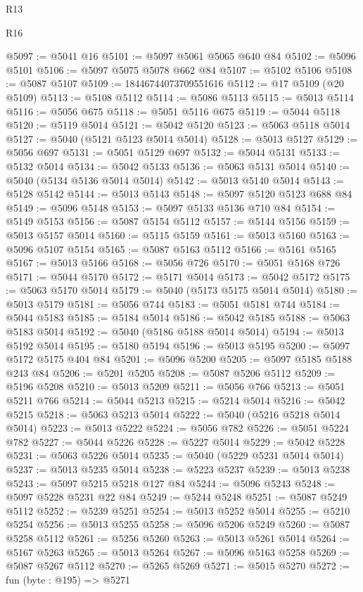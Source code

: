\begin{lexlean}{R13}
\begin{lexlean}{R16}
\begin{coremodule}
{{{{{{{{{{{{{{{{{{{{{{{{{{{{{{{{{{{{{{{{{{{{{{{{{{{{{{{{{{{{{{{{{{{{{{{{{{{{{{{{{{{{{{{{{{{{{{{{{{{{{{{{{{{{{{{{{@5097 := @5041 @16
@5101 := @5097 @5061 @5065 @640 @84
@5102 := @5096 @5101
@5106 := @5097 @5075 @5078 @662 @84
@5107 := @5102 @5106
@5108 := @5087 @5107
@5109 := 18446744073709551616
@5112 := @17 @5109 (@20 @5109)
@5113 := @5108 @5112
@5114 := @5086 @5113
@5115 := @5013 @5114
@5116 := @5056 @675
@5118 := @5051 @5116 @675
@5119 := @5044 @5118
@5120 := @5119 @5014
@5121 := @5042 @5120
@5123 := @5063 @5118 @5014
@5127 := @5040 (@5121 @5123 @5014 @5014)
@5128 := @5013 @5127
@5129 := @5056 @697
@5131 := @5051 @5129 @697
@5132 := @5044 @5131
@5133 := @5132 @5014
@5134 := @5042 @5133
@5136 := @5063 @5131 @5014
@5140 := @5040 (@5134 @5136 @5014 @5014)
@5142 := @5013 @5140 @5014
@5143 := @5128 @5142
@5144 := @5013 @5143
@5148 := @5097 @5120 @5123 @688 @84
@5149 := @5096 @5148
@5153 := @5097 @5133 @5136 @710 @84
@5154 := @5149 @5153
@5156 := @5087 @5154 @5112
@5157 := @5144 @5156
@5159 := @5013 @5157 @5014
@5160 := @5115 @5159
@5161 := @5013 @5160
@5163 := @5096 @5107 @5154
@5165 := @5087 @5163 @5112
@5166 := @5161 @5165
@5167 := @5013 @5166
@5168 := @5056 @726
@5170 := @5051 @5168 @726
@5171 := @5044 @5170
@5172 := @5171 @5014
@5173 := @5042 @5172
@5175 := @5063 @5170 @5014
@5179 := @5040 (@5173 @5175 @5014 @5014)
@5180 := @5013 @5179
@5181 := @5056 @744
@5183 := @5051 @5181 @744
@5184 := @5044 @5183
@5185 := @5184 @5014
@5186 := @5042 @5185
@5188 := @5063 @5183 @5014
@5192 := @5040 (@5186 @5188 @5014 @5014)
@5194 := @5013 @5192 @5014
@5195 := @5180 @5194
@5196 := @5013 @5195
@5200 := @5097 @5172 @5175 @404 @84
@5201 := @5096 @5200
@5205 := @5097 @5185 @5188 @243 @84
@5206 := @5201 @5205
@5208 := @5087 @5206 @5112
@5209 := @5196 @5208
@5210 := @5013 @5209
@5211 := @5056 @766
@5213 := @5051 @5211 @766
@5214 := @5044 @5213
@5215 := @5214 @5014
@5216 := @5042 @5215
@5218 := @5063 @5213 @5014
@5222 := @5040 (@5216 @5218 @5014 @5014)
@5223 := @5013 @5222
@5224 := @5056 @782
@5226 := @5051 @5224 @782
@5227 := @5044 @5226
@5228 := @5227 @5014
@5229 := @5042 @5228
@5231 := @5063 @5226 @5014
@5235 := @5040 (@5229 @5231 @5014 @5014)
@5237 := @5013 @5235 @5014
@5238 := @5223 @5237
@5239 := @5013 @5238
@5243 := @5097 @5215 @5218 @127 @84
@5244 := @5096 @5243
@5248 := @5097 @5228 @5231 @22 @84
@5249 := @5244 @5248
@5251 := @5087 @5249 @5112
@5252 := @5239 @5251
@5254 := @5013 @5252 @5014
@5255 := @5210 @5254
@5256 := @5013 @5255
@5258 := @5096 @5206 @5249
@5260 := @5087 @5258 @5112
@5261 := @5256 @5260
@5263 := @5013 @5261 @5014
@5264 := @5167 @5263
@5265 := @5013 @5264
@5267 := @5096 @5163 @5258
@5269 := @5087 @5267 @5112
@5270 := @5265 @5269
@5271 := @5015 @5270
@5272 := fun (byte : @195) => @5271
}}}}}}}}}}}}}}}}}}}}}}}}}}}}}}}}}}}}}}}}}}}}}}}}}}}}}}}}}}}}}}}}}}}}}}}}}}}}}}}}}}}}}}}}}}}}}}}}}}}}}}}}}}}}}}}}}
\end{coremodule}
\end{lexlean}
\end{lexlean}

